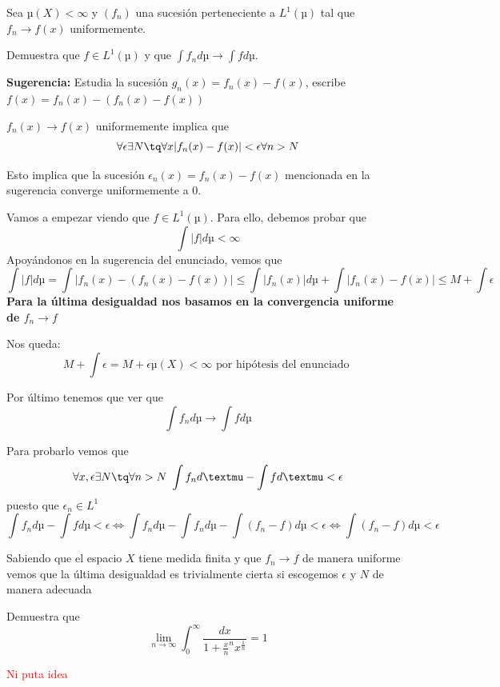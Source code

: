\begin{problem}[17]
Sea $µ(X)<\infty$ y $(f_n)$ una sucesión perteneciente a $L^1(µ)$ tal que $f_n\rightarrow f(x)$ uniformemente.

Demuestra que $f\in L^1(µ)$ y que $\int f_n dµ \rightarrow \int f dµ$.

\textbf{Sugerencia:} Estudia la sucesión $g_n(x)=f_n(x)-f(x)$, escribe $f(x)=f_n(x)-(f_n(x)-f(x))$

\solution

$f_n(x) \to f(x)$ uniformemente implica que
\[\forall \epsilon \exists N \tq \forall x |f_n(x)-f(x)|< \epsilon \forall n > N\]

Esto implica que la sucesión $\epsilon_n(x)=f_n(x)-f(x)$ mencionada en la sugerencia converge uniformemente a 0.

Vamos a empezar viendo que $f\in L^1(µ)$. Para ello, debemos probar que
\[\int |f|dµ < \infty\]
Apoyándonos en la sugerencia del enunciado, vemos que
\[\int |f|dµ = \int |f_n(x)-(f_n(x)-f(x))| \leq \int |f_n(x)|dµ +\int |f_n(x)-f(x)| \leq M + \int \epsilon\]
\textbf{Para la última desigualdad nos basamos en la convergencia uniforme de $f_n \to f$}

Nos queda:
\[M + \int \epsilon = M + \epsilon µ(X) < \infty \text{ por hipótesis del enunciado }\]

Por último tenemos que ver que
\[\int f_n dµ \to \int f dµ\]

Para probarlo vemos que
\[\forall x, \epsilon \exists N \tq \forall n > N \ \int f_n dµ - \int f dµ < \epsilon\]
puesto que $\epsilon_n \in L^1$
\[\int f_n dµ - \int f dµ < \epsilon \iff \int f_n dµ - \int f_n dµ - \int (f_n-f)dµ < \epsilon \iff  \int (f_n-f)dµ < \epsilon\]

Sabiendo que el espacio $X$ tiene medida finita y que $f_n \to f$ de manera uniforme vemos que la última desigualdad es trivialmente cierta si escogemos $\epsilon$ y $N$ de manera adecuada

\end{problem}


\begin{problem}[18]
Demuestra que
\[\lim_{n\to\infty}\int_0^{\infty}\frac{dx}{1+\frac{x}{n}^n x^{\frac{1}{n}}} = 1\]

\solution
\textcolor{red}{Ni puta idea}
\end{problem}

